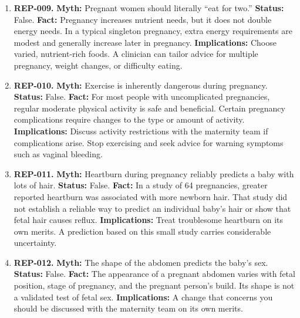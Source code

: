 \documentclass[11pt,oneside]{book}
\begin{document}
\begin{enumerate}[leftmargin=0pt,labelwidth=0pt,labelsep=0pt,itemindent=0pt]
\item[] \textbf{REP-009.} \textbf{Myth:} Pregnant women should literally ``eat for two.''\newline
\textbf{Status:} False.\newline
\textbf{Fact:} Pregnancy increases nutrient needs, but it does not double energy needs. In a typical singleton pregnancy, extra energy requirements are modest and generally increase later in pregnancy. \cite{ref326}\newline
\textbf{Implications:} Choose varied, nutrient-rich foods. A clinician can tailor advice for multiple pregnancy, weight changes, or difficulty eating.
\item[] \textbf{REP-010.} \textbf{Myth:} Exercise is inherently dangerous during pregnancy.\newline
\textbf{Status:} False.\newline
\textbf{Fact:} For most people with uncomplicated pregnancies, regular moderate physical activity is safe and beneficial. Certain pregnancy complications require changes to the type or amount of activity. \cite{ref254}\newline
\textbf{Implications:} Discuss activity restrictions with the maternity team if complications arise. Stop exercising and seek advice for warning symptoms such as vaginal bleeding.
\item[] \textbf{REP-011.} \textbf{Myth:} Heartburn during pregnancy reliably predicts a baby with lots of hair.\newline
\textbf{Status:} False.\newline
\textbf{Fact:} In a study of 64 pregnancies, greater reported heartburn was associated with more newborn hair. That study did not establish a reliable way to predict an individual baby's hair or show that fetal hair causes reflux. \cite{ref255}\newline
\textbf{Implications:} Treat troublesome heartburn on its own merits. A prediction based on this small study carries considerable uncertainty.
\item[] \textbf{REP-012.} \textbf{Myth:} The shape of the abdomen predicts the baby's sex.\newline
\textbf{Status:} False.\newline
\textbf{Fact:} The appearance of a pregnant abdomen varies with fetal position, stage of pregnancy, and the pregnant person's build. Its shape is not a validated test of fetal sex. \cite{ref327}\newline
\textbf{Implications:} A change that concerns you should be discussed with the maternity team on its own merits.

\end{enumerate}
\end{document}
